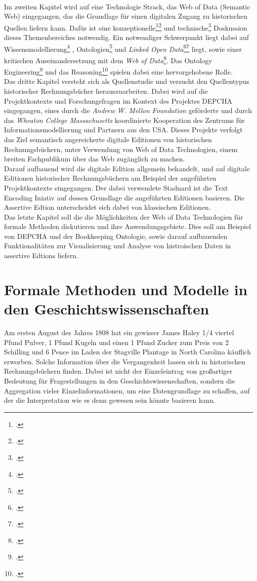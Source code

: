 \documentclass[12pt,a4paper]{article}
\begin{document}
\\
 Im zweiten Kapitel wird auf eine Technologie Strack, das Web of Data (Semantic Web) eingegangen, das die Grundlage für einen digitalen Zugang zu historischen Quellen liefern kann. Dafür ist eine konzeptionelle\footcite{berners2001semantic}\footcite{cardoso2007semantic} und technische\footcite{bernstein2016new} Doskussion dieses Themenbereiches notwendig. Ein notwendiger Schwerpunkt liegt dabei auf Wissensmodellierung\footcite{kelly2016practical} , Ontologien\footcite{stuckenschmidt2009ontologien} und \textit{Linked Open Data}\footcite{rietveld2015linked}\footcite{bauer2011linked} liegt, sowie einer kritischen Auseinandersetzung mit dem \textit{Web of Data}\footcite{swartz2013aaron}. Das Ontology Engineering\footcite{hitzler2016ontology} und das Reasoning\footcite{bursztyn2015reasoning} spielen dabei eine hervorgehobene Rolle.
\\
Das dritte Kapitel versteht sich als Quellenstudie und versucht den Quellentypus historischer Rechnungsbücher herauszuarbeiten. Dabei wird auf die Projektkontexte und Forschungsfragen im Kontext des Projektes DEPCHA eingegangen, eines durch die \textit{Andrew W. Mellon Foundation} geförderte und durch das \textit{Wheaton College Massachusetts} koordinierte Kooperation des Zentrums für Informationsmodellierung und Partnern aus den USA. Dieses Projekte verfolgt das Ziel semantisch angereicherte digitale Editionen von historischen Rechnungsbüchern, unter Verwendung von Web of Data Technologien, einem breiten Fachpublikum über das Web zugänglich zu machen.
\\
Darauf aufbauend wird die digitale Edition allgemein behandelt, und auf digitale Editionen historischer Rechnungsbüchern am Beispiel der angeführten Projektkontexte eingegangen. Der dabei verwendete Stadnard ist die Text Encoding Iniativ auf dessen Grundlage die angeführten Editionen basieren. Die Assertive Edtion unterscheidet sich dabei von klassischen Editionen. 
\\
Das letzte Kapitel soll die die Möglichkeiten der Web of Data Technologien für formale Methoden diskutieren und ihre Anwendungsgebiete. Dies soll am Beispiel von DEPCHA und der Bookkeeping Ontologie, sowie darauf aufbauenden Funktionalitäten zur Visualisierung und Analyse von histroischen Daten in assertive Edtions liefern.


\section{Formale Methoden und Modelle in den Geschichtswissenschaften}
Am ersten August des Jahres 1808 hat ein gewisser James Haley 1/4 viertel Pfund Pulver, 1 Pfund Kugeln und einen 1 Pfund Zucker zum Preis von 2 Schilling und 6 Pence im Laden der Stagville Plantage in North Carolina käuflich erworben. Solche Information über die Vergangenheit lassen sich in historischen Rechnungsbüchern finden. Dabei ist nicht der Einzeleintrag von großartiger Bedeutung für Fragestellungen in den Geschichtswissenschaften, sondern die Aggregation vieler Einzelinformationen, um eine Datengrundlage zu schaffen, auf der die Interpretation wie es denn gewesen sein könnte basieren kann.
\\
\end{document}
